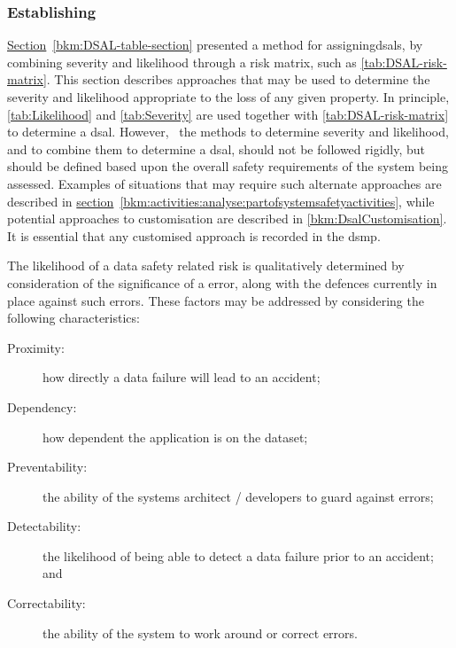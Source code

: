 \subsubsection{Establishing }
\label{bkm:Establishing-DSALS}
\hyperref[bkm:DSAL-table-section]{Section}~\ref{bkm:DSAL-table-section} %
presented a method for \cbstart assigning\cbend \gls{dsal}s, by combining severity and likelihood through a risk matrix, such as \autoref{tab:DSAL-risk-matrix}. This section describes approaches that may be used to determine the severity and likelihood appropriate to the loss of any given property. In principle, \autoref {tab:Likelihood} and \autoref{tab:Severity} are used together with \autoref{tab:DSAL-risk-matrix} to determine a \gls{dsal}. However, \cbstart\ the methods to determine severity and likelihood, and to combine them to determine a \gls{dsal}, should not be followed rigidly, but should be defined based upon the overall safety requirements of the system being assessed. Examples of situations that may require such alternate approaches are described in
\hyperref[bkm:activities:analyse:partofsystemsafetyactivities]{section}~\ref{bkm:activities:analyse:partofsystemsafetyactivities}, %
while potential approaches to customisation are described in \autoref{bkm:DsalCustomisation}.
It is essential that any customised approach is recorded in the \gls{dsmp}\cbend.

The likelihood of a data safety related risk is qualitatively determined by
consideration of the significance of a \gls{error}, along with the defences currently in place against such errors. These factors may be addressed by
considering the following characteristics:

\begin{description}
  \item[Proximity:] how directly a data failure will lead to an accident;
  \item[Dependency:] how dependent the application is on the \gls{dataset};
  \item[Preventability:] the ability of the systems architect / developers to guard against \cbstart\glspl{error}\cbend;
  \item[Detectability:] the likelihood of being able to detect a data failure prior to an accident; and
  \item[Correctability:] the ability of the system to work around or correct \cbstart\glspl{error}\cbend.
\end{description}

